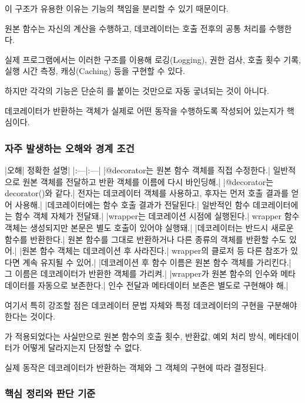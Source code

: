 이 구조가 유용한 이유는 기능의 책임을 분리할 수 있기 때문이다.

원본 함수는 자신의 계산을 수행하고, 데코레이터는 호출 전후의 공통 처리를 수행한다.

실제 프로그램에서는 이러한 구조를 이용해 로깅(Logging), 권한 검사, 호출 횟수 기록, 실행 시간 측정, 캐싱(Caching) 등을 구현할 수 있다.

하지만 각각의 기능은 단순히 를 붙이는 것만으로 자동 궇녀되는 것이 아니다.

데코레이터가 반환하는 객체가 실제로 어떤 동작을 수행하도록 작성되어 있는지가 핵심이다.

\subsubsection{자주 발생하는 오해와 경계 조건}

\begin{dhktable}
|오해|	정확한 설명|
|:---|:---|
|@decorator는 원본 함수 객체를 직접 수정한다.|	일반적으로 원본 객체를 전달하고 반환 객체를 이름에 다시 바인딩해.|
|@decorator는 decorator()와 같다.|	전자는 데코레이터 객체를 사용하고, 후자는 먼저 호출 결과를 얻어 사용해.|
|데코레이터에는 함수 호출 결과가 전달된다.|	일반적인 함수 데코레이터에는 함수 객체 자체가 전달돼.|
|wrapper는 데코레이션 시점에 실행된다.|	wrapper 함수 객체는 생성되지만 본문은 별도 호출이 있어야 실행돼.|
|데코레이터는 반드시 새로운 함수를 반환한다.|	원본 함수를 그대로 반환하거나 다른 종류의 객체를 반환할 수도 있어.|
|원본 함수 객체는 데코레이션 후 사라진다.|	wrapper의 클로저 등 다른 참조가 있다면 계속 유지될 수 있어.|
|데코레이션 후 함수 이름은 원본 함수 객체를 가리킨다.|	그 이름은 데코레이터가 반환한 객체를 가리켜.|
|wrapper가 원본 함수의 인수와 메타데이터를 자동으로 보존한다.|	인수 전달과 메타데이터 보존은 별도로 구현해야 해.|
\end{dhktable}

여기서 특히 강조할 점은 데코레이터 문법 자체와 특정 데코레이터의 구현을 구분해야 한다는 것이다.

가 적용되었다는 사실만으로 원본 함수의 호출 횟수, 반환값, 예외 처리 방식, 메타데이터가 어떻게 달라지는지 단정할 수 없다.

실제 동작은 데코레이터가 반환하는 객체와 그 객체의 구현에 따라 결정된다.

\subsubsection{핵심 정리와 판단 기준}

